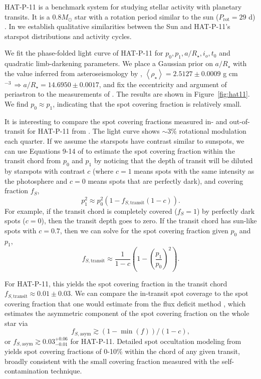 HAT-P-11 is a benchmark system for studying stellar activity with planetary transits. It is a $0.8 M_\odot$ star with a rotation period similar to the sun ($P_\mathrm{rot} = 29$ d) \citep{Bakos2010,Sanchis-Ojeda2011,Southworth2011,Deming2011}. In \citet{Morris2017a,Morris2017b,Morris2018d} we establish qualitative similarities between the Sun and HAT-P-11's starspot distributions and activity cycles. 

We fit the phase-folded \kepler light curve of HAT-P-11 for $p_0, p_1, a/R_\star, i_o, t_0$ and quadratic limb-darkening parameters. We place a Gaussian prior on $a/R_\star$ with the value inferred from asteroseismology by \citet{Christensen-Dalsgaard2010}, $\left< \rho_\star \right> = 2.5127 \pm 0.0009 $ g cm$^{-3} \, \Rightarrow a/R_\star= 14.6950 \pm 0.0017$, and fix the eccentricity and argument of periastron to the measurements of \citet{Winn2010}. The results are shown in Figure~\ref{fig:hat11}. We find $p_0 \approx p_1$, indicating that the spot covering fraction is relatively small. 

It is interesting to compare the spot covering fractions measured in- and out-of-transit for HAT-P-11 from \citet{Morris2017a}. The \kepler light curve shows $\sim3$\% rotational modulation each quarter. If we assume the starspots have contrast similar to sunspots, we can use Equations 9-14 of \citet{Morris2017a} to estimate the spot covering fraction within the transit chord from $p_0$ and $p_1$ by noticing that the depth of transit will be diluted by starspots with contrast $c$ (where $c=1$ means spots with the same intensity as the photosphere and $c=0$ means spots that are perfectly dark), and covering fraction $f_S$,
\begin{equation}
p_1^2 \approx p_0^2 (1 - f_{S,\mathrm{transit}} (1-c)).
\end{equation}
For example, if the transit chord is completely covered ($f_S=1$) by perfectly dark spots ($c=0$), then the transit depth goes to zero. If the transit chord has sun-like spots with $c=0.7$, then we can solve for the spot covering fraction given $p_0$ and $p_1$,
\begin{equation}
f_{S,\mathrm{transit}} \approx \frac{1}{1-c}\left(1 - \left(\frac{p_1}{p_0} \right)^2\right). \label{eqn:fs_transit}
\end{equation}

For HAT-P-11, this yields the spot covering fraction in the transit chord $f_{S,\mathrm{transit}} \approx 0.01 \pm 0.03$. We can compare the in-transit spot coverage to the spot covering fraction that one would estimate from the flux deficit method \citep{Morris2017a}, which estimates the asymmetric component of the spot covering fraction on the whole star via
\begin{equation}
f_{S, \mathrm{asym}} \gtrsim (1 - \min(f))/(1 - c),
\end{equation}
or $f_{S, \mathrm{asym}} \gtrsim 0.03_{-0.01}^{+0.06}$ for HAT-P-11. Detailed spot occultation modeling from \citet{Morris2017a} yields spot covering fractions of 0-10\% within the chord of any given transit, broadly consistent with the small covering fraction measured with the self-contamination technique.  

